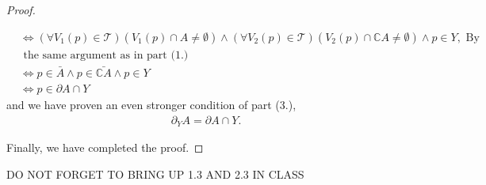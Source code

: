\documentclass[10pt,a4paper]{article}
\theoremstyle{theorem}
\theoremstyle{definition}
\newcommand{\Tau}{\mathcal{T}}
\begin{document}
\begin{proof}
\begin{enumerate}
\begin{align*}
&\iff (\forall V_1(p) \in \Tau)(V_1(p) \cap A \not = \emptyset) \land (\forall V_2(p) \in \Tau)(V_2(p) \cap \mathbb{C}A \not = \emptyset) \land p \in Y, \text{ By}\\
&\text{ the same argument as in part (1.)}\\
&\iff p \in \bar{A} \land p \in \bar{\mathbb{C}A} \land p \in Y\\
&\iff p \in \partial A \cap Y
\end{align*}
and we have proven an even stronger condition of part (3.), 
\begin{align*}
\partial_Y A = \partial A \cap Y.
\end{align*}
\end{enumerate}
Finally,  we have completed the proof.
\end{proof}

DO NOT FORGET TO BRING UP 1.3 AND 2.3 IN CLASS
\end{document}
